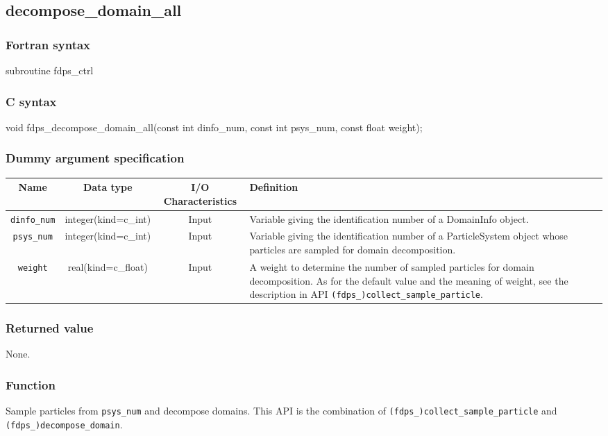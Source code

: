 \subsection{decompose\_domain\_all}
\subsubsection*{Fortran syntax}
\begin{screen}
\begin{spverbatim}
subroutine fdps_ctrl%
\end{spverbatim}
\end{screen}

\subsubsection*{C syntax}
\begin{screen}
\begin{spverbatim}
void fdps_decompose_domain_all(const int dinfo_num, 
                               const int psys_num,  
                               const float weight); 
\end{spverbatim}
\end{screen}


\subsubsection*{Dummy argument specification}
\begin{table}[h]
\begin{tabularx}{\linewidth}{cccX}
\toprule
\rowcolor{Snow2}
Name & Data type & I/O Characteristics & Definition \\
\midrule
\texttt{dinfo\_num} & integer(kind=c\_int) & Input & Variable giving the identification number of a DomainInfo object.\\
\texttt{psys\_num} & integer(kind=c\_int) & Input & Variable giving the identification number of a ParticleSystem object whose particles are sampled for domain decomposition. \\
\texttt{weight} & real(kind=c\_float) & Input & A weight to determine the number of sampled particles for domain decomposition. As for the default value and the meaning of weight, see the description in API \texttt{(fdps\_)collect\_sample\_particle}. \\
\bottomrule
\end{tabularx}
\end{table}

\subsubsection*{Returned value}
None.

\subsubsection*{Function}
Sample particles from \texttt{psys\_num} and decompose domains. This API is the combination of {\tt (fdps\_)collect\_sample\_particle} and {\tt (fdps\_)decompose\_domain}.

\clearpage
